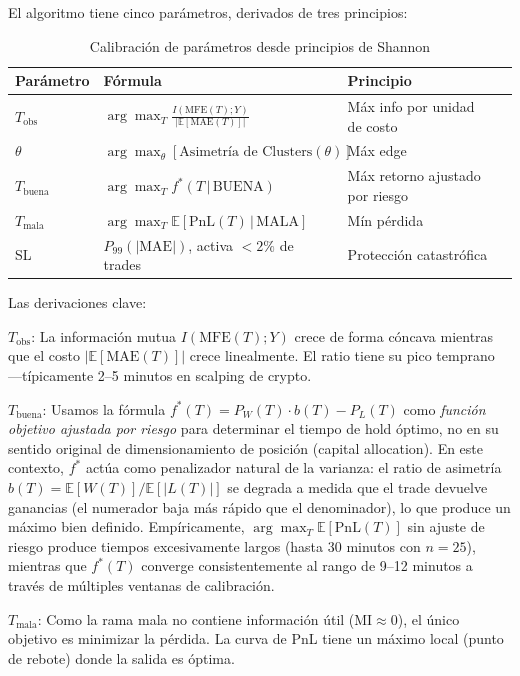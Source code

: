 \documentclass[11pt,a4paper]{article}
\begin{document}
El algoritmo tiene cinco parámetros, derivados de tres principios:

\begin{table}[H]
\centering
\caption{Calibración de parámetros desde principios de Shannon}
\begin{tabular}{llll}
\toprule
Parámetro & Fórmula & Principio \\
\midrule
$T_{\text{obs}}$ & $\arg\max_T \frac{I(\text{MFE}(T); Y)}{|\mathbb{E}[\text{MAE}(T)]|}$ & Máx info por unidad de costo \\
$\theta$ & $\arg\max_\theta [\text{Asimetría de Clusters}(\theta)]$ & Máx edge \\
$T_{\text{buena}}$ & $\arg\max_T f^*(T \,|\, \text{BUENA})$ & Máx retorno ajustado por riesgo \\
$T_{\text{mala}}$ & $\arg\max_T \mathbb{E}[\text{PnL}(T) \,|\, \text{MALA}]$ & Mín pérdida \\
SL & $P_{99}(|\text{MAE}|)$, activa ${<}2\%$ de trades & Protección catastrófica \\
\bottomrule
\end{tabular}
\end{table}

Las derivaciones clave:

\textbf{$T_{\text{obs}}$}: La información mutua $I(\text{MFE}(T); Y)$ crece de forma cóncava mientras que el costo $|\mathbb{E}[\text{MAE}(T)]|$ crece linealmente. El ratio tiene su pico temprano ---típicamente 2--5 minutos en scalping de crypto.

\textbf{$T_{\text{buena}}$}: Usamos la fórmula $f^*(T) = P_W(T) \cdot b(T) - P_L(T)$ como \emph{función objetivo ajustada por riesgo} para determinar el tiempo de hold óptimo, no en su sentido original de dimensionamiento de posición (capital allocation). En este contexto, $f^*$ actúa como penalizador natural de la varianza: el ratio de asimetría $b(T) = \mathbb{E}[W(T)] / \mathbb{E}[|L(T)|]$ se degrada a medida que el trade devuelve ganancias (el numerador baja más rápido que el denominador), lo que produce un máximo bien definido. Empíricamente, $\arg\max_T \mathbb{E}[\text{PnL}(T)]$ sin ajuste de riesgo produce tiempos excesivamente largos (hasta 30 minutos con $n=25$), mientras que $f^*(T)$ converge consistentemente al rango de 9--12 minutos a través de múltiples ventanas de calibración.

\textbf{$T_{\text{mala}}$}: Como la rama mala no contiene información útil ($\text{MI} \approx 0$), el único objetivo es minimizar la pérdida. La curva de PnL tiene un máximo local (punto de rebote) donde la salida es óptima.
\end{document}
